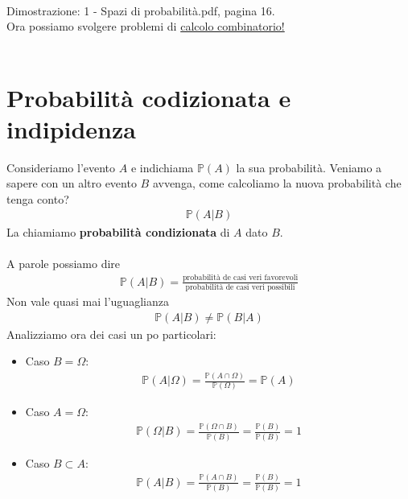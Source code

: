 \documentclass[a4paper,12pt]{article}
\begin{document}
\vspace{5px}\\
Dimostrazione: 1 - Spazi di probabilità.pdf, pagina 16. \\
Ora possiamo svolgere problemi di \hyperref[sec:calc_comb]{calcolo combinatorio!}\\
\vspace{2px} \\
\section{Probabilità codizionata e indipidenza}
Consideriamo l'evento $A$ e indichiama $\mathbb{P}(A)$ la sua probabilità. Veniamo a sapere con un altro evento $B$ avvenga, come calcoliamo la nuova probabilità che tenga conto?
\begin{align*}
  \mathbb{P}(A|B)
\end{align*}
La chiamiamo \textbf{probabilità condizionata} di $A$ dato $B$.\\
\vspace{2px} \\
A parole possiamo dire
\begin{align*}
  \mathbb{P}(A|B) = \frac{\text{probabilità de casi veri favorevoli}}{\text{probabilità de casi veri possibili}}
\end{align*}
Non vale quasi mai l'uguaglianza 
\begin{align*}
  \mathbb{P}(A|B) \neq \mathbb{P}(B|A)
\end{align*}
Analizziamo ora dei casi un po particolari:
\begin{itemize}
  \item Caso $B = \Omega$:
  \begin{align*}
    \mathbb{P}(A| \Omega) = \frac{\mathbb{P}(A \cap \Omega)}{\mathbb{P}(\Omega)} = \mathbb{P}(A)
  \end{align*}
  \item Caso $A = \Omega$:
  \begin{align*}
      \mathbb{P}(\Omega|B) = \frac{\mathbb{P}(\Omega \cap B)}{\mathbb{P}(B)}= \frac{\mathbb{P}(B)}{\mathbb{P}(B)} = 1
  \end{align*}
  \item Caso $B \subset A$:
  \begin{align*}
      \mathbb{P}(A|B) = \frac{\mathbb{P}(A \cap B)}{\mathbb{P}(B)}= \frac{\mathbb{P}(B)}{\mathbb{P}(B)}=1 
  \end{align*}
\end{itemize}
\end{document}
